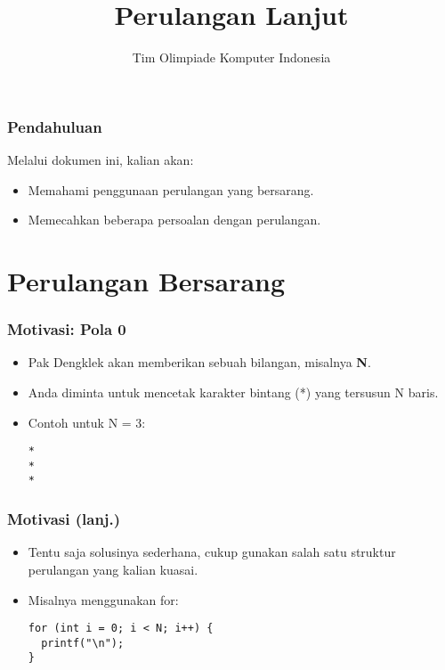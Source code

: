 

\title{Perulangan Lanjut}
\author{Tim Olimpiade Komputer Indonesia}
\date{}



\begin{frame}
\titlepage
\end{frame}

\begin{frame}
\frametitle{Pendahuluan}
Melalui dokumen ini, kalian akan:
\begin{itemize}
  \item Memahami penggunaan perulangan yang bersarang.
  \item Memecahkan beberapa persoalan dengan perulangan.
\end{itemize}
\end{frame}

\section{Perulangan Bersarang}
\frame{\sectionpage}

\begin{frame}[fragile]
\frametitle{Motivasi: Pola 0}
\begin{itemize}
  \item Pak Dengklek akan memberikan sebuah bilangan, misalnya \textbf{N}.
  \item Anda diminta untuk mencetak karakter bintang (*) yang tersusun N baris.
  \item Contoh untuk N = 3:
\begin{lstlisting}
*
*
*
\end{lstlisting}
\end{itemize}
\end{frame}

\begin{frame}[fragile]
\frametitle{Motivasi (lanj.)}
\begin{itemize}
  \item Tentu saja solusinya sederhana, cukup gunakan salah satu struktur perulangan yang kalian kuasai.
  \item Misalnya menggunakan for:
\begin{lstlisting}
for (int i = 0; i < N; i++) {
  printf("\n");
}
\end{lstlisting}
\end{itemize}
\end{frame}

